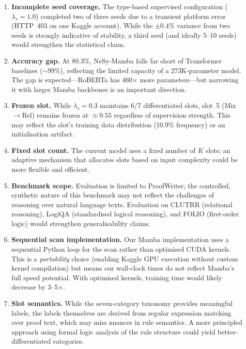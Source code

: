 \documentclass[conference]{IEEEtran}
\DeclareRobustCommand{\model}{NeSy-Mamba}
\begin{document}
\begin{enumerate}[nosep]
    \item \textbf{Incomplete seed coverage.}  The type-based
          supervised configuration ($\lambda_s{=}1.0$) completed
          two of three seeds due to a transient platform error
          (HTTP~403 on one Kaggle account).  While the
          $\pm 0.4\%$ variance from two seeds is strongly
          indicative of stability, a third seed (and ideally
          5--10 seeds) would strengthen the statistical claim.

    \item \textbf{Accuracy gap.}  At $80.3\%$, \model{} falls
          far short of Transformer baselines ($\sim$99\%),
          reflecting the limited capacity of a 273K-parameter
          model.  The gap is expected---RoBERTa has 460$\times$
          more parameters---but narrowing it with larger Mamba
          backbones is an important direction.

    \item \textbf{Frozen slot.}  While $\lambda_s{=}0.3$
          maintains 6/7 differentiated slots, slot~5
          (Mix$\to$Rel) remains frozen at $\approx 0.55$
          regardless of supervision strength.  This may reflect
          the slot's training data distribution (10.9\% frequency)
          or an initialisation artifact.

    \item \textbf{Fixed slot count.}  The current model uses a
          fixed number of $K$ slots; an adaptive mechanism that
          allocates slots based on input complexity could be more
          flexible and efficient.

    \item \textbf{Benchmark scope.}  Evaluation is limited to
          ProofWriter; the controlled, synthetic nature of this
          benchmark may not reflect the challenges of reasoning
          over natural language texts.  Evaluation on CLUTRR
          (relational reasoning), LogiQA
          (standardised logical reasoning), and FOLIO (first-order
          logic) would strengthen generalisability claims.

    \item \textbf{Sequential scan implementation.}  Our Mamba
          implementation uses a sequential Python loop for the
          scan rather than optimised CUDA kernels.  This is
          a \emph{portability} choice (enabling Kaggle GPU
          execution without custom kernel compilation) but means
          our wall-clock times do not reflect Mamba's full
          speed potential.  With optimised kernels, training time
          would likely decrease by 3--5$\times$.

    \item \textbf{Slot semantics.}  While the seven-category
          taxonomy provides meaningful labels, the labels
          themselves are derived from regular expression matching
          over proof text, which may miss nuances in rule
          semantics.  A more principled approach using formal
          logic analysis of the rule structure could yield
          better-differentiated categories.
\end{enumerate}
\end{document}
